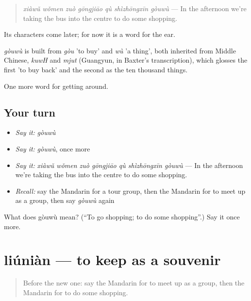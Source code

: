 \begin{quote}
\emph{xiàwǔ wǒmen zuò gōngjiāo qù shìzhōngxīn gòuwù} — In the afternoon we're taking the bus into the centre to do some shopping.
\end{quote}

Its characters come later; for now it is a word for the ear.

\begin{cousinweb}
\emph{gòuwù} is built from \emph{gòu} 'to buy' and \emph{wù} 'a thing', both inherited from Middle Chinese, \emph{kuwH} and \emph{mjut} (Guangyun, in Baxter's transcription), which glosses the first 'to buy back' and the second as the ten thousand things.
\end{cousinweb}

\begin{grammarlens}[title={What you've built}]
One more word for getting around.
\end{grammarlens}

\subsection*{Your turn}
\begin{itemize}
\raggedright
  \item \emph{Say it:} \emph{gòuwù}
  \item \emph{Say it:} \emph{gòuwù}, once more
  \item \emph{Say it:} \emph{xiàwǔ wǒmen zuò gōngjiāo qù shìzhōngxīn gòuwù} — In the afternoon we're taking the bus into the centre to do some shopping.
  \item \emph{Recall:} say the Mandarin for a tour group, then the Mandarin for to meet up as a group, then say \emph{gòuwù} again
\end{itemize}

\begin{tcolorbox}[breakable,colback=teal!4,colframe=teal!35!black,title={Before you move on}]
What does gòuwù mean? (\textquotedblleft{}To go shopping; to do some shopping\textquotedblright{}.) Say it once more.
\end{tcolorbox}
\section[liúniàn]{liúniàn — to keep as a souvenir}

\label{lesson:ZH-C434-liunian}



\begin{quote}
Before the new one: say the Mandarin for to meet up as a group, then the Mandarin for to do some shopping.
\end{quote}

